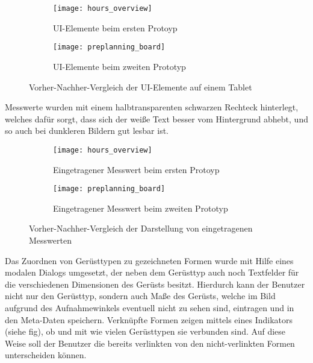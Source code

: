 \begin{figure}[h]
  \centering
  \begin{subfigure}[t]{0.4\textwidth}
    \texttt{[image: hours\_overview]}
    \caption{UI-Elemente beim ersten Protoyp}
  \end{subfigure}
  \begin{subfigure}[t]{0.4\textwidth}
    \texttt{[image: preplanning\_board]}
    \caption{UI-Elemente beim zweiten Prototyp}
  \end{subfigure}
  \caption{Vorher-Nachher-Vergleich der UI-Elemente auf einem Tablet}
  \label{fig:tablet}
\end{figure}

Messwerte wurden mit einem halbtransparenten schwarzen Rechteck hinterlegt, welches dafür sorgt, dass sich der weiße Text besser vom Hintergrund abhebt, und so auch bei dunkleren Bildern gut lesbar ist.

\begin{figure}[h]
  \centering
  \begin{subfigure}[t]{0.4\textwidth}
    \texttt{[image: hours\_overview]}
    \caption{Eingetragener Messwert beim ersten Protoyp}
  \end{subfigure}
  \begin{subfigure}[t]{0.4\textwidth}
    \texttt{[image: preplanning\_board]}
    \caption{Eingetragener Messwert beim zweiten Prototyp}
  \end{subfigure}
  \caption{Vorher-Nachher-Vergleich der Darstellung von eingetragenen Messwerten}
  \label{fig:tablet}
\end{figure}

Das Zuordnen von Gerüsttypen zu gezeichneten Formen wurde mit Hilfe eines modalen Dialogs umgesetzt, der neben dem Gerüsttyp auch noch Textfelder für die verschiedenen Dimensionen des Gerüsts besitzt.
Hierdurch kann der Benutzer nicht nur den Gerüsttyp, sondern auch Maße des Gerüsts, welche im Bild aufgrund des Aufnahmewinkels eventuell nicht zu sehen sind, eintragen und in den Meta-Daten speichern.
Verknüpfte Formen zeigen mittels eines Indikators (siehe fig), ob und mit wie vielen Gerüsttypen sie verbunden sind.
Auf diese Weise soll der Benutzer die bereits verlinkten von den nicht-verlinkten Formen unterscheiden können. \\

